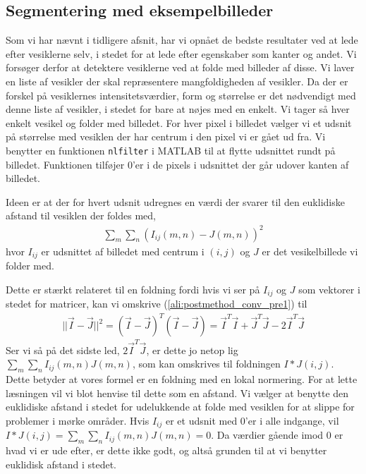 \subsection{Segmentering med eksempelbilleder}
Som vi har nævnt i tidligere afsnit, har vi opnået de bedste resultater ved at lede efter vesiklerne selv, i stedet for at lede efter egenskaber som kanter og andet. Vi forsøger derfor at detektere vesiklerne ved at folde med billeder af disse. Vi laver en liste af vesikler der skal repræsentere mangfoldigheden af vesikler. Da der er forskel på vesiklernes intensitetsværdier, form og størrelse er det nødvendigt med denne liste af vesikler, i stedet for bare at nøjes med en enkelt. Vi tager så hver enkelt vesikel og folder med billedet. For hver pixel i billedet vælger vi et udsnit på størrelse med vesiklen der har centrum i den pixel vi er gået ud fra. Vi benytter en funktionen \texttt{nlfilter} i MATLAB til at flytte udsnittet rundt på billedet. Funktionen tilføjer 0'er i de pixels i udsnittet der går udover kanten af billedet.

Ideen er at der for hvert udsnit udregnes en værdi der svarer til den euklidiske afstand til vesiklen der foldes med,
\begin{align}
	\sum_m\sum_n\left(I_{ij}(m,n)-J(m,n)\right)^2\label{ali:postmethod_conv_pre1}
\end{align}
hvor $I_{ij}$ er udsnittet af billedet med centrum i $(i,j)$ og $J$ er det vesikelbillede vi folder med. 

Dette er stærkt relateret til en foldning fordi hvis vi ser på $I_{ij}$ og $J$ som vektorer i stedet for matricer, kan vi omskrive (\ref{ali:postmethod_conv_pre1}) til
\begin{align}
	||\vec{I}-\vec{J}||^2 = (\vec{I}-\vec{J})^T(\vec{I}-\vec{J}) = \vec{I}^T\vec{I} + \vec{J}^T\vec{J}-2\vec{I}^T\vec{J}
\end{align}
Ser vi så på det sidste led, $2\vec{I}^T\vec{J}$, er dette jo netop lig $\sum_m\sum_nI_{ij}(m,n)J(m,n)$, som kan omskrives til foldningen $I*J(i,j)$. Dette betyder at vores formel er en foldning med en lokal normering. For at lette læsningen vil vi blot henvise til dette som en afstand. Vi vælger at benytte den euklidiske afstand i stedet for udelukkende at folde med vesiklen for at slippe for problemer i mørke områder. Hvis $I_{ij}$ er et udsnit med 0'er i alle indgange, vil $I*J(i,j)=\sum_m\sum_nI_{ij}(m,n)J(m,n)=0$. Da værdier gående imod 0 er hvad vi er ude efter, er dette ikke godt, og altså grunden til at vi benytter euklidisk afstand i stedet.

